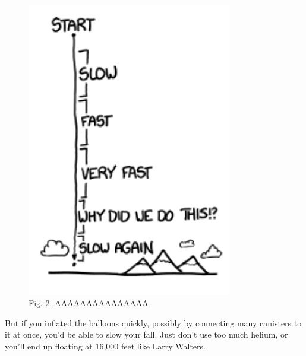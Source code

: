 {\begin{figure}[!htbp]
\centering
\includegraphics[scale=0.5, max width=0.8\textwidth]{imgs/a/62/balloon_fall.png}
\caption{Fig. 2: AAAAAAAAAAAAAAA}
\end{figure}

{But if you inflated the balloons quickly, possibly by connecting many canisters to it at once, you'd be able to slow your fall. Just don't use too much helium, or you'll end up floating at 16,000 feet like Larry Walters.}

}
